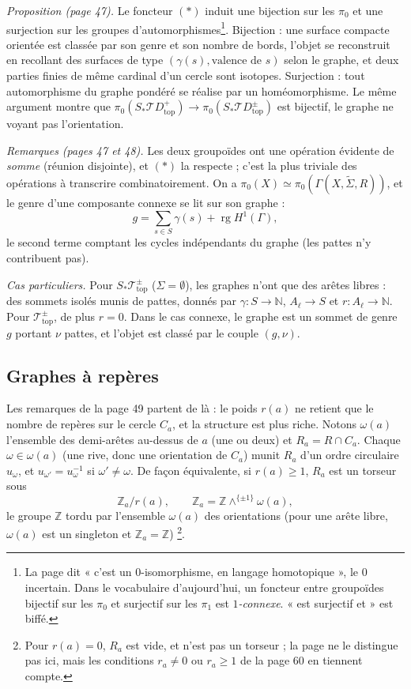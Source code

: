 \documentclass[11pt,a4paper]{article}
\begin{document}
\emph{Proposition (page 47).} Le foncteur $(*)$ induit une bijection sur les
$\pi_0$ et une surjection sur les groupes d'automorphismes\footnote{La page dit
« c'est un $0$-isomorphisme, en langage homotopique », le $0$ incertain. Dans le
vocabulaire d'aujourd'hui, un foncteur entre groupoïdes bijectif sur les $\pi_0$
et surjectif sur les $\pi_1$ est \emph{$1$-connexe}. « est surjectif et » est
biffé.}. Bijection : une surface compacte orientée est classée par son genre et
son nombre de bords, l'objet se reconstruit en recollant des surfaces de type
$(\gamma(s), \text{valence de } s)$ selon le graphe, et deux parties finies de
même cardinal d'un cercle sont isotopes. Surjection : tout automorphisme du
graphe pondéré se réalise par un homéomorphisme. Le même argument montre que
$\pi_0(S_{*}\mathcal{T}D^{+}_{\mathrm{top}}) \to
\pi_0(S_{*}\mathcal{T}D^{\pm}_{\mathrm{top}})$ est bijectif, le graphe ne voyant pas
l'orientation.

\emph{Remarques (pages 47 et 48).} Les deux groupoïdes ont une opération
évidente de \emph{somme} (réunion disjointe), et $(*)$ la respecte ; c'est la
plus triviale des opérations à transcrire combinatoirement. On a $\pi_0(X)
\simeq \pi_0(\Gamma(X, \widetilde{\Sigma}, R))$, et le genre d'une composante
connexe se lit sur son graphe :
\[
g = \sum_{s \in S} \gamma(s) + \operatorname{rg} H^{1}(\Gamma),
\]
le second terme comptant les cycles indépendants du graphe (les pattes n'y
contribuent pas).

\emph{Cas particuliers.} Pour $S_{*}\mathcal{T}^{\pm}_{\mathrm{top}}$ ($\Sigma =
\emptyset$), les graphes n'ont que des arêtes libres : des sommets isolés munis
de pattes, donnés par $\gamma : S \to \mathbb{N}$, $A_\ell \to S$ et $r : A_\ell
\to \mathbb{N}$. Pour $\mathcal{T}^{\pm}_{\mathrm{top}}$, de plus $r = 0$. Dans
le cas connexe, le graphe est un sommet de genre $g$ portant $\nu$ pattes, et
l'objet est classé par le couple $(g, \nu)$.

\subsection*{Graphes à repères}

Les remarques de la page 49 partent de là : le poids $r(a)$ ne retient que le
nombre de repères sur le cercle $C_a$, et la structure est plus riche. Notons $\omega(a)$ l'ensemble des demi-arêtes
au-dessus de $a$ (une ou deux) et $R_a = R \cap C_a$. Chaque $\omega \in
\omega(a)$ (une rive, donc une orientation de $C_a$) munit $R_a$ d'un ordre
circulaire $u_\omega$, et $u_{\omega'} = u_\omega^{-1}$ si $\omega' \neq \omega$.
De façon équivalente, si $r(a) \geq 1$, $R_a$ est un torseur sous
\[
\mathbb{Z}_a/r(a), \qquad \mathbb{Z}_a = \mathbb{Z}
\wedge^{\{\pm 1\}} \omega(a),
\]
le groupe $\mathbb{Z}$ tordu par l'ensemble $\omega(a)$ des orientations (pour
une arête libre, $\omega(a)$ est un singleton et $\mathbb{Z}_a = \mathbb{Z}$)
\footnote{Pour $r(a) = 0$, $R_a$ est vide, et n'est pas un torseur ; la page ne
le distingue pas ici, mais les conditions $r_a \neq 0$ ou $r_a \geq 1$ de la page
60 en tiennent compte.}.
\end{document}
